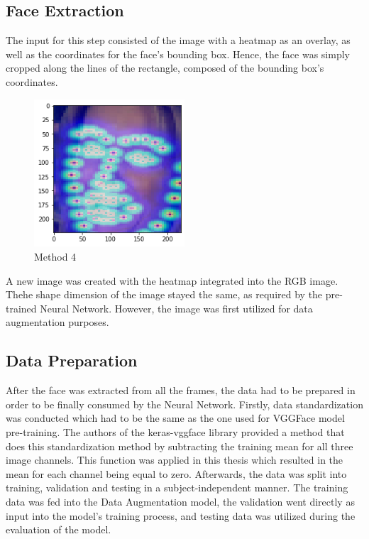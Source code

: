 \subsection{Face Extraction}
The input for this step consisted of the image with a heatmap as an overlay, as well as the coordinates for the face's bounding box. Hence, the face was simply cropped along the lines of the rectangle, composed of the bounding box's coordinates. %

\begin{center}
\begin{figure}[H]
  \begin{center}
  \includegraphics[angle=0, width=0.5\textwidth]{Figures/method_4.png}
  \caption{Method 4}
  \label{fig:MachineLearningModelMethod_4}
  \end{center}
\end{figure}
\end{center}

A new image was created with the heatmap integrated into the RGB image. Thehe shape dimension of the image stayed the same, as required by the pre-trained Neural Network. However, the image was first utilized for data augmentation purposes.

\subsection{Data Preparation}
After the face was extracted from all the frames, the data had to be prepared in order to be finally consumed by the Neural Network.
\newline\newline
Firstly, data standardization was conducted which had to be the same as the one used for VGGFace model pre-training. The authors of the keras-vggface library provided a method that does this standardization method by subtracting the training mean for all three image channels. This function was applied in this thesis which resulted in the mean for each channel being equal to zero.
\newline\newline
Afterwards, the data was split into training, validation and testing in a subject-independent manner. The training data was fed into the Data Augmentation model, the validation went directly as input into the model's training process, and testing data was utilized during the evaluation of the model.

